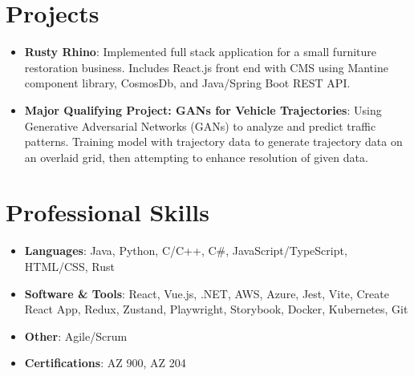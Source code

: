 \documentclass[letterpaper,11pt]{article}
\newcommand{\resumeItem}[2]{
  \item\small{
    \textbf{#1}{: #2 \vspace{-2pt}}
  }
}
\newcommand{\resumeSubItem}[2]{\resumeItem{#1}{#2}\vspace{-4pt}}
\newcommand{\resumeSubHeadingListStart}{\begin{itemize}[leftmargin=*]}
\newcommand{\resumeSubHeadingListEnd}{\end{itemize}}
\begin{document}
\section{Projects}
  \resumeSubHeadingListStart
  \resumeSubItem{Rusty Rhino}
      {Implemented full stack application for a small furniture restoration business. Includes React.js front end with CMS using Mantine component library, CosmosDb, and Java/Spring Boot REST API.}
  \resumeSubItem{Major Qualifying Project: GANs for Vehicle Trajectories}
      {Using Generative Adversarial Networks (GANs) to analyze and predict traffic patterns. Training model with trajectory data to generate trajectory data on an overlaid grid, then attempting to enhance resolution of given data.}
  \resumeSubHeadingListEnd
  

\section{Professional Skills}
 \resumeSubHeadingListStart
    \item{
     \textbf{Languages}{: Java, Python, C/C++, C\#, JavaScript/TypeScript, HTML/CSS, Rust }
     }
     \item{
     \textbf{Software \& Tools}{: React, Vue.js, .NET, AWS, Azure, Jest, Vite, Create React App, Redux, Zustand, Playwright, Storybook, Docker, Kubernetes, Git }
    }
    \item{
     \textbf{Other}{: Agile/Scrum}
    }
    \item{
     \textbf{Certifications}{: AZ 900, AZ 204}
    }
 \resumeSubHeadingListEnd

\end{document}
